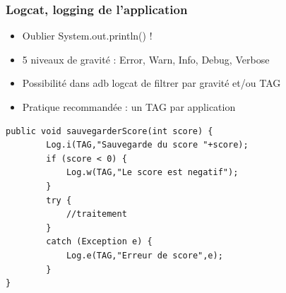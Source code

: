 \documentclass{beamer}
\begin{document}
\begin{frame}[fragile]
\frametitle{Logcat, logging de l'application}
\begin{itemize}
  \item Oublier System.out.println() !
  \item 5 niveaux de gravité : Error, Warn, Info, Debug, Verbose
  \item Possibilité dans adb logcat de filtrer par gravité et/ou TAG
  \item Pratique recommandée : un TAG par application
 \end{itemize}
 \begin{lstlisting}
public void sauvegarderScore(int score) {
        Log.i(TAG,"Sauvegarde du score "+score);
        if (score < 0) {
            Log.w(TAG,"Le score est negatif");
        }
        try {
            //traitement
        }
        catch (Exception e) {
        	Log.e(TAG,"Erreur de score",e);
        }
}
\end{lstlisting}
\end{frame}
\end{document}
